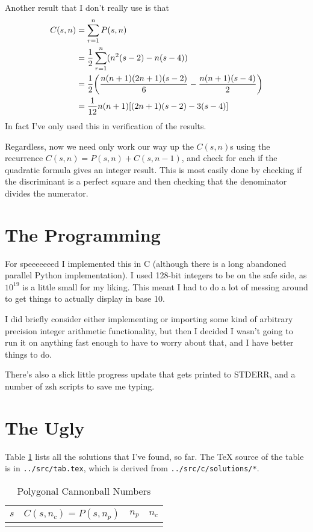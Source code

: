 \documentclass[fleqn,a4paper,11pt]{article}
\begin{document}
Another result that I don't really use is that
\begin{align*}
C(s, n) &= \sum_{r = 1}^n P(s, n) \\
    &= \frac 12 \sum_{r = 1}^n (n^2(s - 2) - n(s - 4)) \\
    &= \frac 12 \pqty{\frac{n(n + 1)(2n + 1)(s - 2)} 6
                    - \frac{n(n + 1)(s - 4)} 2} \\
    &= \frac 1{12}n(n + 1)\bqty{(2n + 1)(s - 2) - 3(s - 4)}
\end{align*}
In fact I've only used this in verification of the results.

Regardless, now we need only work our way up the \(C(s, n)\)s using the
recurrence \(C(s, n) = P(s, n) + C(s, n - 1)\), and check for each if the
quadratic formula gives an integer result. This is most easily done by checking
if the discriminant is a perfect square and then checking that the denominator
divides the numerator.

\section{The Programming}

For speeeeeeed I implemented this in C (although there is a long abandoned
parallel Python implementation). I used 128-bit integers to be on the safe side,
as \(10^{19}\) is a little small for my liking. This meant I had to do a lot of
messing around to get things to actually display in base 10.

I did briefly consider either implementing or importing some kind of arbitrary
precision integer arithmetic functionality, but then I decided I wasn't going to
run it on anything fast enough to have to worry about that, and I have better
things to do.

There's also a slick little progress update that gets printed to STDERR, and a
number of zsh scripts to save me typing.

\section{The Ugly}

Table \ref{tab_ugly} lists all the solutions that I've found, so far. The \TeX
source of the table is in \texttt{../src/tab.tex}, which is derived from
\texttt{../src/c/solutions/*}.

\begin{longtable}{*4r}
\toprule
\boldmath \(s\) & \boldmath \(C(s, n_c) = P(s, n_p)\)
& \boldmath \(n_p\) & \boldmath \(n_c\) \\
\midrule

\bottomrule
\caption{Polygonal Cannonball Numbers}
\label{tab_ugly}
\end{longtable}
\end{document}
